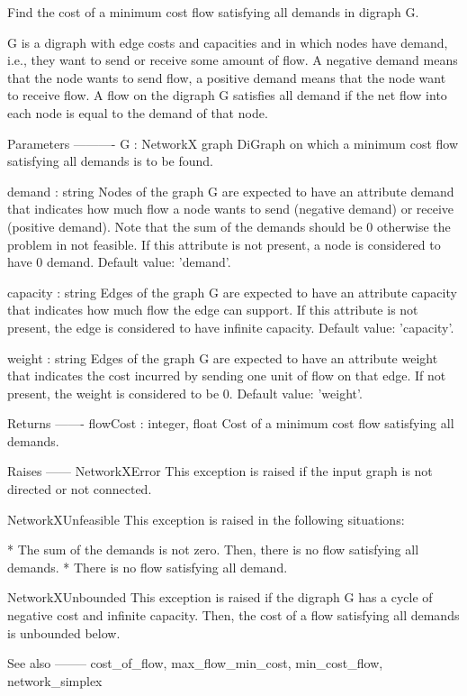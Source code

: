 \begin{DoxyVerb}Find the cost of a minimum cost flow satisfying all demands in digraph G.

G is a digraph with edge costs and capacities and in which nodes
have demand, i.e., they want to send or receive some amount of
flow. A negative demand means that the node wants to send flow, a
positive demand means that the node want to receive flow. A flow on
the digraph G satisfies all demand if the net flow into each node
is equal to the demand of that node.

Parameters
----------
G : NetworkX graph
    DiGraph on which a minimum cost flow satisfying all demands is
    to be found.

demand : string
    Nodes of the graph G are expected to have an attribute demand
    that indicates how much flow a node wants to send (negative
    demand) or receive (positive demand). Note that the sum of the
    demands should be 0 otherwise the problem in not feasible. If
    this attribute is not present, a node is considered to have 0
    demand. Default value: 'demand'.

capacity : string
    Edges of the graph G are expected to have an attribute capacity
    that indicates how much flow the edge can support. If this
    attribute is not present, the edge is considered to have
    infinite capacity. Default value: 'capacity'.

weight : string
    Edges of the graph G are expected to have an attribute weight
    that indicates the cost incurred by sending one unit of flow on
    that edge. If not present, the weight is considered to be 0.
    Default value: 'weight'.

Returns
-------
flowCost : integer, float
    Cost of a minimum cost flow satisfying all demands.

Raises
------
NetworkXError
    This exception is raised if the input graph is not directed or
    not connected.

NetworkXUnfeasible
    This exception is raised in the following situations:

        * The sum of the demands is not zero. Then, there is no
          flow satisfying all demands.
        * There is no flow satisfying all demand.

NetworkXUnbounded
    This exception is raised if the digraph G has a cycle of
    negative cost and infinite capacity. Then, the cost of a flow
    satisfying all demands is unbounded below.

See also
--------
cost_of_flow, max_flow_min_cost, min_cost_flow, network_simplex


\end{DoxyVerb}

